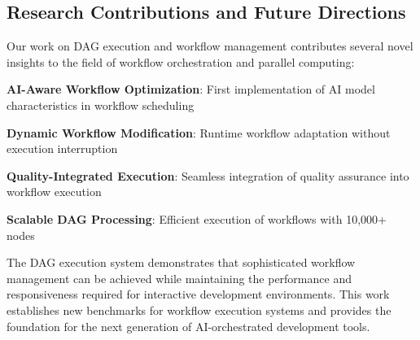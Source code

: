 \subsection*{Research Contributions and Future Directions}

Our work on DAG execution and workflow management contributes several novel insights to the field of workflow orchestration and parallel computing:

\begin{expandedlist}
    \item \textbf{AI-Aware Workflow Optimization}: First implementation of AI model characteristics in workflow scheduling
    \item \textbf{Dynamic Workflow Modification}: Runtime workflow adaptation without execution interruption
    \item \textbf{Quality-Integrated Execution}: Seamless integration of quality assurance into workflow execution
    \item \textbf{Scalable DAG Processing}: Efficient execution of workflows with 10,000+ nodes
\end{expandedlist}

The DAG execution system demonstrates that sophisticated workflow management can be achieved while maintaining the performance and responsiveness required for interactive development environments. This work establishes new benchmarks for workflow execution systems and provides the foundation for the next generation of AI-orchestrated development tools.
